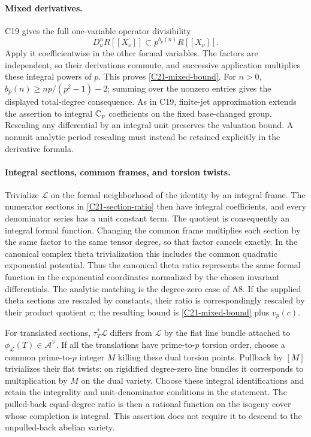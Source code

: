 \documentclass[11pt]{article}
\providecommand{\mathscr}[1]{\mathcal{#1}}
\theoremstyle{definition}\newtheorem{definition}[theorem]{Definition}\newtheorem{remark}[theorem]{Remark}
\begin{document}
\paragraph{Mixed derivatives.}
C19 gives the full one-variable operator divisibility
\[
 D_\nu^nR[[X_\nu]]\subset
              p^{b_p(n)}R[[X_\nu]].
\]
Apply it coefficientwise in the other formal variables.
The factors are independent, so their derivations commute,
and successive application multiplies these integral powers
of $p$.  This proves \eqref{C21-mixed-bound}.
For $n>0$, $b_p(n)\geq np/(p^2-1)-2$; summing over the
nonzero entries gives the displayed total-degree consequence.
As in C19, finite-jet approximation extends the assertion to
integral $\mathbb C_p$ coefficients on the fixed base-changed group.
Rescaling any differential by an integral unit preserves the
valuation bound.  A nonunit analytic period rescaling must
instead be retained explicitly in the derivative formula.

\paragraph{Integral sections, common frames, and torsion twists.}
Trivialize $\mathscr L$ on the formal neighborhood of the
identity by an integral frame.  The numerator sections in
\eqref{C21-section-ratio} then have integral coefficients,
and every denominator series has a unit constant term.
The quotient is consequently an integral formal function.
Changing the common frame multiplies each section by the
same factor to the same tensor degree, so that factor cancels
exactly.  In the canonical complex theta trivialization this
includes the common quadratic exponential potential.
Thus the canonical theta ratio represents the same formal
function in the exponential coordinates normalized by the
chosen invariant differentials.  The analytic matching is
the degree-zero case of A8.  If the supplied theta sections
are rescaled by constants, their ratio is correspondingly
rescaled by their product quotient $c$; the resulting bound
is \eqref{C21-mixed-bound} plus $v_p(c)$.

For translated sections, $\tau_T^*\mathscr L$ differs from
$\mathscr L$ by the flat line bundle attached to
$\phi_{\mathscr L}(T)\in\mathcal A^\vee$.
If all the translations have prime-to-$p$ torsion order,
choose a common prime-to-$p$ integer $M$ killing these
dual torsion points.  Pullback by $[M]$ trivializes their
flat twists: on rigidified degree-zero line bundles it
corresponds to multiplication by $M$ on the dual variety.
Choose these integral identifications and retain the
integrality and unit-denominator conditions in the statement.
The pulled-back equal-degree ratio is then a rational function
on the isogeny cover whose completion is integral.
This assertion does not require it to descend to the
unpulled-back abelian variety.
\end{document}
